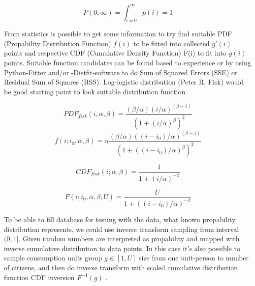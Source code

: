 \begin{equation} \label{eq:propability_overall_infty}
	P(0,\infty)=\int_{i=0}^{\infty} p(i)=1
\end{equation}


From statistics is possible to get some information to try find suitable PDF
(Propability Distribution Function) $f(i)$ to be fitted into collected $g'(i)$
points and respective CDF (Cumulative Density Function) F(i) to fit into
$g(i)$ points. Suitable function candidates can be found based to experience
or by using Python-Fitter and/or -Distfit-software to do Sum of Squared Errors
(SSE) or Residual Sum of Squa\-res (RSS). Log-logistic
distribution\allowbreak\cite{LogLogisticDistribution} (Peter R.
Fisk\allowbreak\cite{Fisk}) would be good starting point to look suitable
distribution function.

\begin{equation} \label{eq:PDFfisk}
 PDF_{fisk}(i,\alpha,\beta)=
 \frac{(\beta/\alpha)(i/\alpha)^{(\beta-1)}}{(1+(i/\alpha)^\beta)^2}
\end{equation}
\begin{equation} \label{eq:PDFf}
 f(i;i_0,\alpha,\beta)=
 \alpha\frac{
  (\beta/\alpha)((i-i_0)/\alpha)^{(\beta-1)}
 }{(1+((i-i_0)/\alpha)^\beta)^2}
\end{equation}

\begin{equation} \label{eq:CDFfisk}
 CDF_{fisk}(i;\alpha,\beta)
 =\frac{1}{1+(i/\alpha)^{-\beta}}
\end{equation}

\begin{equation} \label{eq:CDFF}
 F(i;i_0,\alpha,\beta,U)
 =\frac{U}{1+((i-i_0)/\alpha)^{-\beta}}
\end{equation}

To be able to fill database for testing with the data, what known propability
distribution represents, we could use inverse transform sampling from interval
$(0,1]$. Given random numbers are interpreted as propability and mapped with
inverse cumulative distribution to data points\allowbreak\cite{
 InvTransformSampling}. In this case it's also possible to sample consumption
units group $g \in [1,U]$ size from one unit-person to number of citizens, and
then do inverse transform with scaled cumulative distribution function CDF
inversion $F^{-1}(g)$ .


